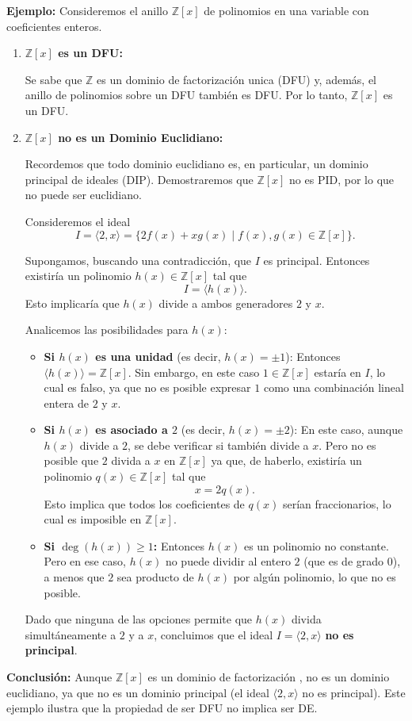 \textbf{Ejemplo:} Consideremos el anillo $\mathbb{Z}[x]$ de polinomios en una variable con coeficientes enteros.

\begin{enumerate}
    \item \textbf{$\mathbb{Z}[x]$ es un DFU:}
    
    Se sabe que $\mathbb{Z}$ es un dominio de factorizaci\'on unica (DFU) y, adem\'as, el anillo de polinomios sobre un DFU tambi\'en es DFU. Por lo tanto, $\mathbb{Z}[x]$ es un DFU.
    
    \item \textbf{$\mathbb{Z}[x]$ no es un Dominio Euclidiano:}
    
    Recordemos que todo dominio euclidiano es, en particular, un dominio principal de ideales (DIP). Demostraremos que $\mathbb{Z}[x]$ no es PID, por lo que no puede ser euclidiano.
    
    Consideremos el ideal
    \[
    I = \langle 2, x \rangle = \{2f(x) + xg(x) \mid f(x),g(x) \in \mathbb{Z}[x]\}.
    \]
    
    Supongamos, buscando una contradicci\'on, que $I$ es principal. Entonces existir\'ia un polinomio $h(x) \in \mathbb{Z}[x]$ tal que
    \[
    I = \langle h(x) \rangle.
    \]
    Esto implicar\'ia que $h(x)$ divide a ambos generadores $2$ y $x$.
    
    Analicemos las posibilidades para $h(x)$:
    
    \begin{itemize}
        \item \textbf{Si $h(x)$ es una unidad} (es decir, $h(x)=\pm 1$):  
        Entonces $\langle h(x) \rangle = \mathbb{Z}[x]$. Sin embargo, en este caso $1 \in \mathbb{Z}[x]$ estar\'ia en $I$, lo cual es falso, ya que no es posible expresar $1$ como una combinaci\'on lineal entera de $2$ y $x$.
    
        \item \textbf{Si $h(x)$ es asociado a $2$} (es decir, $h(x)=\pm 2$):  
        En este caso, aunque $h(x)$ divide a $2$, se debe verificar si tambi\'en divide a $x$. Pero no es posible que $2$ divida a $x$ en $\mathbb{Z}[x]$ ya que, de haberlo, existir\'ia un polinomio $q(x) \in \mathbb{Z}[x]$ tal que
        \[
        x = 2q(x).
        \]
        Esto implica que todos los coeficientes de $q(x)$ ser\'ian fraccionarios, lo cual es imposible en $\mathbb{Z}[x]$.
    
        \item \textbf{Si $\deg(h(x)) \ge 1$:}  
        Entonces $h(x)$ es un polinomio no constante. Pero en ese caso, $h(x)$ no puede dividir al entero $2$ (que es de grado $0$), a menos que $2$ sea producto de $h(x)$ por alg\'un polinomio, lo que no es posible.
    \end{itemize}
    
    Dado que ninguna de las opciones permite que $h(x)$ divida simult\'aneamente a $2$ y a $x$, concluimos que el ideal $I = \langle 2, x \rangle$ \textbf{no es principal}.
\end{enumerate}

\textbf{Conclusi\'on:} Aunque $\mathbb{Z}[x]$ es un dominio de factorizaci\'on \unica, no es un dominio euclidiano, ya que no es un dominio principal (el ideal $\langle 2, x \rangle$ no es principal). Este ejemplo ilustra que la propiedad de ser DFU no implica ser DE.
